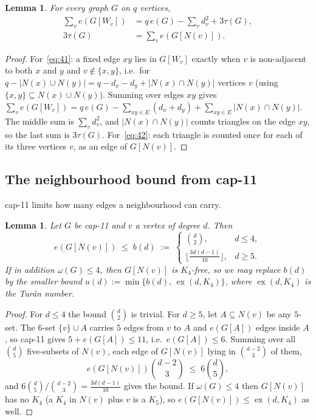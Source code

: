 \documentclass[11pt,reqno]{amsart}
\newtheorem{lemma}[theorem]{Lemma}
\theoremstyle{definition}
\theoremstyle{remark}
\newcommand{\abs}[1]{\left|#1\right|}
\newcommand{\ex}{\operatorname{ex}}
\newcommand{\capeleven}{\textsf{cap-11}}
\begin{document}
\begin{lemma}\label{lem:identity}
For every graph $G$ on $q$ vertices,
\begin{align}
  \sum_{v} e(G[W_v]) &= q\,e(G)-\sum_v d_v^2+3\tau(G),\label{eq:41}\\
  3\tau(G) &= \sum_v e(G[N(v)]).\label{eq:42}
\end{align}
\end{lemma}

\begin{proof}
For~\eqref{eq:41}: a fixed edge $xy$ lies in $G[W_v]$ exactly when $v$ is
non-adjacent to both $x$ and $y$ and $v\notin\{x,y\}$, i.e.\ for
$q-\abs{N(x)\cup N(y)}=q-d_x-d_y+\abs{N(x)\cap N(y)}$ vertices $v$ (using
$\{x,y\}\subseteq N(x)\cup N(y)$). Summing over edges $xy$ gives
$\sum_v e(G[W_v]) = q\,e(G)-\sum_{xy\in E}(d_x+d_y)+\sum_{xy\in E}\abs{N(x)\cap N(y)}$.
The middle sum is $\sum_v d_v^2$, and $\abs{N(x)\cap N(y)}$ counts triangles on the
edge $xy$, so the last sum is $3\tau(G)$. For~\eqref{eq:42}: each triangle is
counted once for each of its three vertices $v$, as an edge of $G[N(v)]$.
\end{proof}

\subsection{The neighbourhood bound from \texorpdfstring{\capeleven}{cap-11}}
\capeleven{} limits how many edges a neighbourhood can carry.

\begin{lemma}\label{lem:nbhd}
Let $G$ be \capeleven{} and $v$ a vertex of degree $d$. Then
\[
  e(G[N(v)])\;\le\; b(d)\;:=\;
  \begin{cases}
    \binom d2, & d\le 4,\\[1mm]
    \big\lfloor \tfrac{3d(d-1)}{10}\big\rfloor, & d\ge 5.
  \end{cases}
\]
If in addition $\omega(G)\le 4$, then $G[N(v)]$ is $K_4$-free, so we may replace
$b(d)$ by the smaller bound $u(d):=\min\{b(d),\,\ex(d,K_4)\}$, where $\ex(d,K_4)$ is
the Tur\'an number.
\end{lemma}

\begin{proof}
For $d\le 4$ the bound $\binom d2$ is trivial. For $d\ge 5$, let $A\subseteq N(v)$
be any $5$-set. The $6$-set $\{v\}\cup A$ carries $5$ edges from $v$ to $A$ and
$e(G[A])$ edges inside $A$, so \capeleven{} gives $5+e(G[A])\le 11$, i.e.\
$e(G[A])\le 6$. Summing over all $\binom d5$ five-subsets of $N(v)$, each edge of
$G[N(v)]$ lying in $\binom{d-2}{3}$ of them,
\[
  e(G[N(v)])\binom{d-2}{3}\;\le\; 6\binom d5,
\]
and $6\binom d5/\binom{d-2}3=\tfrac{3d(d-1)}{10}$ gives the bound. If $\omega(G)\le
4$ then $G[N(v)]$ has no $K_4$ (a $K_4$ in $N(v)$ plus $v$ is a $K_5$), so
$e(G[N(v)])\le\ex(d,K_4)$ as well.
\end{proof}
\end{document}
